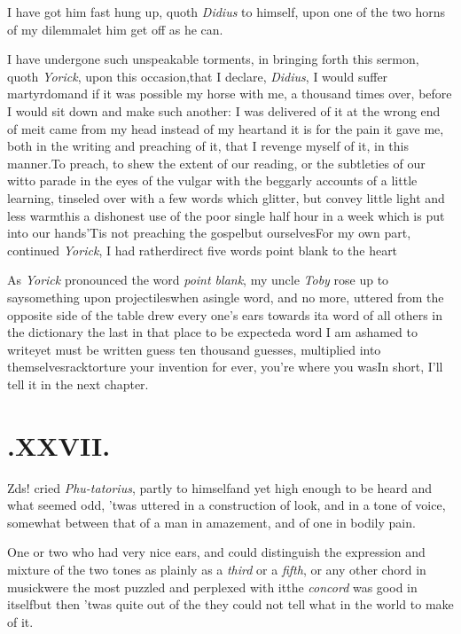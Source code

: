 \documentclass{article}
\begin{document}
\tsk I have got him fast hung up, quoth \textit{Didius}
to himself, upon one of the two horns of my
dilemma\tsh let him get off as he can.

I have undergone such unspeakable torments, in bringing
forth this sermon, quoth \textit{Yorick}, upon this
occasion,\tsk that I declare, \textit{Didius}, I would suffer
martyrdom\tsk and if it was possible my horse with me, a
thousand times over, before I would sit down and make such
another: I was delivered of it at the wrong end of me\tsk it
came from my head instead of my heart\tsk and it is for the
pain it gave me, both in the writing and preaching of it,
that I revenge myself of it, in this manner.\tsk To preach,
to shew the extent of our reading, or the subtleties of our
wit\tsk to parade in the eyes of the vulgar with the
beggarly accounts of a little learning, tinseled over with a
few words which glitter, but convey little light and less
warmth\tsk is a dishonest use of the poor single half hour
in a week which is put into our hands\tsk ’Tis not
preaching
the gospel\tsk but ourselves\tsk For my own part, continued
\textit{Yorick}, I had rather\break direct five words point blank
to the\break 
heart\tsk

As \textit{Yorick} pronounced the word \textit{point blank},
my uncle \textit{Toby} rose up to say\break something upon
projectiles\tsh when a\break single word, and no more, uttered
from the opposite side of the table drew every one’s ears
towards it\tsk a word of all others in the dictionary the
last in that place to be expected\tsk a word I am ashamed to
write\tsk yet must be written
 guess ten thousand guesses,
multiplied into themselves\tsk rack\tsk torture your
invention for ever, you’re where you was\tsk\break In short,
I’ll tell it in the next chapter.

\null\smallskip
\section{.\enspace XXVII.}

\tsh\tsh\break
\tsh\tsh\tsh\tsh\tsk\break
\tsh\tsh\tsk Z\tsh ds!  cried \textit{Phu-\break tatorius},
partly to himself\tsk and yet high enough to be heard\tsk
and what seemed odd, ’twas uttered in a construction of
look, and in a tone of voice, somewhat between that of a man
in amazement,\break
and of one in bodily pain.

One or two who had very nice ears, and could distinguish the
expression and mixture of the two tones as plainly as a
\textit{third} or a \textit{fifth}, or any other chord in musick\tsk were the most puzzled and perplexed
with it\tsk the \textit{concord} was good in itself\tsk but then
’twas quite out of the
they could not tell what in the world to make of it.
\end{document}
